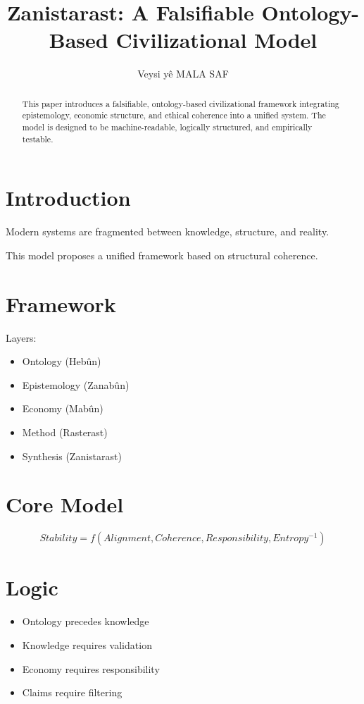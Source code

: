 \documentclass[11pt]{article}
\title{Zanistarast: A Falsifiable Ontology-Based Civilizational Model}
\author{Veysi yê MALA SAF}
\date{}
\begin{document}
\maketitle

\begin{abstract}
This paper introduces a falsifiable, ontology-based civilizational framework integrating epistemology, economic structure, and ethical coherence into a unified system. The model is designed to be machine-readable, logically structured, and empirically testable.
\end{abstract}

\section{Introduction}

Modern systems are fragmented between knowledge, structure, and reality.

This model proposes a unified framework based on structural coherence.

\section{Framework}

Layers:

\begin{itemize}
\item Ontology (Hebûn)
\item Epistemology (Zanabûn)
\item Economy (Mabûn)
\item Method (Rasterast)
\item Synthesis (Zanistarast)
\end{itemize}

\section{Core Model}

\[
Stability = f(Alignment, Coherence, Responsibility, Entropy^{-1})
\]

\section{Logic}

\begin{itemize}
\item Ontology precedes knowledge
\item Knowledge requires validation
\item Economy requires responsibility
\item Claims require filtering
\end{itemize}
\end{document}
